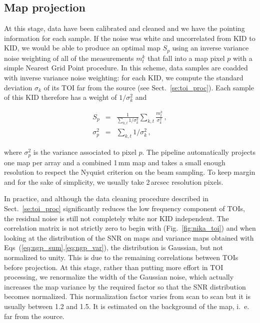 \subsection{Map projection}
\label{se:map_projection}

At this stage, data have been calibrated and cleaned and we have the pointing
information for each sample. If the noise was white and uncorrelated from KID to
KID, we would be able to produce an optimal map $S_p$ using an inverse
variance noise weighting of all of the measurements $m^k_t$ that fall
into a map pixel $p$ with a simple Nearest Grid Point procedure. In
this scheme, data samples are coadded with inverse variance noise
weighting: for each KID, we compute the standard deviation
$\sigma_k$ of its TOI far from the source (see Sect.~\ref{se:toi_proc}). Each
sample of this KID therefore has a weight of $1/\sigma_k^2$ and

\begin{eqnarray}
S_p        &=& \frac{1}{\sum_{k,t}1/\sigma_k^2}\sum_{k,t} \frac{m^k_t}{\sigma_k^2}\,, \label{eq:ngp_sum}\\
\sigma^2_p &=& \sum_{k,t}1/\sigma_k^2\,, \label{eq:ngp_var}
\end{eqnarray}

where $\sigma^2_p$ is the variance associated to pixel $p$. The
pipeline automatically projects one map per array and a combined 1\,mm
map and takes a small enough resolution to respect the Nyquist
criterion on the beam sampling.
To keep margin
and for the sake of simplicity, we usually take 2\,arcsec resolution pixels.

In practice, and although the data cleaning procedure described in
Sect.~\ref{se:toi_proc} significantly reduces the low frequency component of
TOIs, the residual noise is still not completely white nor KID independent. The
correlation matrix is not strictly zero to begin with (Fig.~\ref{fig:nika_toi})
and when looking at the distribution of the SNR on maps and variance maps
obtained with Eqs~(\ref{eq:ngp_sum},\ref{eq:ngp_var}), the distribution is
Gaussian, but not normalized to unity. %
This is due to the remaining correlations between TOIs before projection. At this stage,
rather than putting more effort in TOI processing, we renormalize the width of
the Gaussian noise, which actually increases the map variance by the required factor
so that the SNR distribution becomes normalized. This normalization factor
varies from scan to scan but it is usually between 1.2 and 1.5. It is estimated on
the background of the map, i.~e. far from the source.

